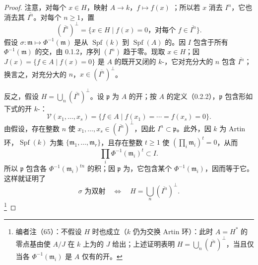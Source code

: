 \begin{proof}
注意，对每个 $x\in H$，映射 $A\to k$，$f\mapsto f(x)$ ；所以若 $x$ 消去 $I^n$，它也消去其 $\overline{I^n}$。对每个 $n\geq1$，置
\[
 (\overline{I^n})^\perp=\{x\in H\mid f(x)=0\text{，对每个 }f\in\overline{I^n}\}.
\]
假设 $\sigma:\mathfrak m\mapsto\Phi^{-1}(\mathfrak m)$ 是从 $\operatorname{Spf}(k)$ 到 $\operatorname{Spf}(A)$ 的。因 $I$ 包含于所有 $\Phi^{-1}(\mathfrak m)$ 的交，由 0.1.2，序列 $(I^n)$ 趋于零。现取 $x\in H$；因 $J(x)=\{f\in A\mid f(x)=0\}$ 是 $A$ 的既开又闭的 $k$-，它对充分大的 $n$ 包含 $\overline{I^n}$；换言之，对充分大的 $n$，$x\in(\overline{I^n})^\perp$。

反之，假设 $H=\bigcup_n(\overline{I^n})^\perp$。设 $\mathfrak p$ 为 $A$ 的开；按 $A$ 的定义（0.2.2），$\mathfrak p$ 包含形如下式的开 $k$-：
\[
 \mathscr V(x_1,\ldots,x_s)=\{f\in A\mid f(x_1)=\cdots=f(x_s)=0\}.
\]
由假设，存在整数 $n$ 使 $x_1,\ldots,x_s\in(\overline{I^n})^\perp$，因此 $I^n\subset\mathfrak p$。此外，因 $k$ 为 Artin 环，$\operatorname{Spf}(k)$ 为集 $\{\mathfrak m_1,\ldots,\mathfrak m_r\}$，且存在整数 $t\geq1$ 使 $(\prod_i\mathfrak m_i)^t=0$，从而
\[
 \prod_i\Phi^{-1}(\mathfrak m_i)^t\subset I.
\]
所以 $\mathfrak p$ 包含各 $\Phi^{-1}(\mathfrak m_i)^{tn}$ 的积；因 $\mathfrak p$ 为，它包含某个 $\Phi^{-1}(\mathfrak m_i)$，因而等于它。这样就证明了
\[
 \sigma\text{ 为双射}\quad\Longleftrightarrow\quad H=\bigcup_n(\overline{I^n})^\perp.
\]
\footnote{编者注（65）：不假设 $H$ 时也成立（$k$ 仍为交换 Artin 环）：此时 $A=H^*$ 的零点基由使 $A/J$ 在 $k$ 上为的 $J$ 给出；上述证明表明 $H=\bigcup_n(\overline{I^n})^\perp$，当且仅当各 $\Phi^{-1}(\mathfrak m_i)$ 是 $A$ 仅有的开。}


\end{proof}
